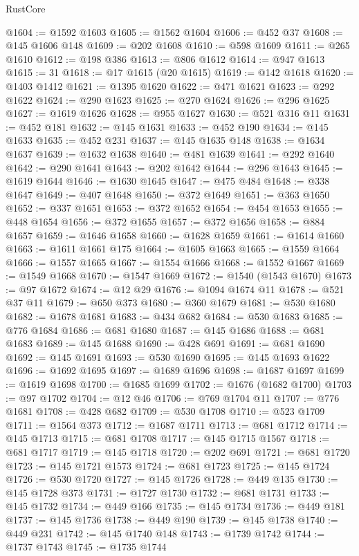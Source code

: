 \begin{lexlean}{RustCore}
\begin{coremodule}
@1604 := @1592 @1603
@1605 := @1562 @1604
@1606 := @452 @37
@1608 := @145 @1606 @148
@1609 := @202 @1608
@1610 := @598 @1609
@1611 := @265 @1610
@1612 := @198 @386
@1613 := @806 @1612
@1614 := @947 @1613
@1615 := 31
@1618 := @17 @1615 (@20 @1615)
@1619 := @142 @1618
@1620 := @1403 @1412
@1621 := @1395 @1620
@1622 := @471 @1621
@1623 := @292 @1622
@1624 := @290 @1623
@1625 := @270 @1624
@1626 := @296 @1625
@1627 := @1619 @1626
@1628 := @955 @1627
@1630 := @521 @316 @11
@1631 := @452 @181
@1632 := @145 @1631
@1633 := @452 @190
@1634 := @145 @1633
@1635 := @452 @231
@1637 := @145 @1635 @148
@1638 := @1634 @1637
@1639 := @1632 @1638
@1640 := @481 @1639
@1641 := @292 @1640
@1642 := @290 @1641
@1643 := @202 @1642
@1644 := @296 @1643
@1645 := @1619 @1644
@1646 := @1630 @1645
@1647 := @475 @484
@1648 := @338 @1647
@1649 := @407 @1648
@1650 := @372 @1649
@1651 := @363 @1650
@1652 := @337 @1651
@1653 := @372 @1652
@1654 := @454 @1653
@1655 := @448 @1654
@1656 := @372 @1655
@1657 := @372 @1656
@1658 := @884 @1657
@1659 := @1646 @1658
@1660 := @1628 @1659
@1661 := @1614 @1660
@1663 := @1611 @1661 @175
@1664 := @1605 @1663
@1665 := @1559 @1664
@1666 := @1557 @1665
@1667 := @1554 @1666
@1668 := @1552 @1667
@1669 := @1549 @1668
@1670 := @1547 @1669
@1672 := @1540 (@1543 @1670)
@1673 := @97 @1672
@1674 := @12 @29
@1676 := @1094 @1674 @11
@1678 := @521 @37 @11
@1679 := @650 @373
@1680 := @360 @1679
@1681 := @530 @1680
@1682 := @1678 @1681
@1683 := @434 @682
@1684 := @530 @1683
@1685 := @776 @1684
@1686 := @681 @1680
@1687 := @145 @1686
@1688 := @681 @1683
@1689 := @145 @1688
@1690 := @428 @691
@1691 := @681 @1690
@1692 := @145 @1691
@1693 := @530 @1690
@1695 := @145 @1693 @1622
@1696 := @1692 @1695
@1697 := @1689 @1696
@1698 := @1687 @1697
@1699 := @1619 @1698
@1700 := @1685 @1699
@1702 := @1676 (@1682 @1700)
@1703 := @97 @1702
@1704 := @12 @46
@1706 := @769 @1704 @11
@1707 := @776 @1681
@1708 := @428 @682
@1709 := @530 @1708
@1710 := @523 @1709
@1711 := @1564 @373
@1712 := @1687 @1711
@1713 := @681 @1712
@1714 := @145 @1713
@1715 := @681 @1708
@1717 := @145 @1715 @1567
@1718 := @681 @1717
@1719 := @145 @1718
@1720 := @202 @691
@1721 := @681 @1720
@1723 := @145 @1721 @1573
@1724 := @681 @1723
@1725 := @145 @1724
@1726 := @530 @1720
@1727 := @145 @1726
@1728 := @449 @135
@1730 := @145 @1728 @373
@1731 := @1727 @1730
@1732 := @681 @1731
@1733 := @145 @1732
@1734 := @449 @166
@1735 := @145 @1734
@1736 := @449 @181
@1737 := @145 @1736
@1738 := @449 @190
@1739 := @145 @1738
@1740 := @449 @231
@1742 := @145 @1740 @148
@1743 := @1739 @1742
@1744 := @1737 @1743
@1745 := @1735 @1744

\end{coremodule}
\end{lexlean}
